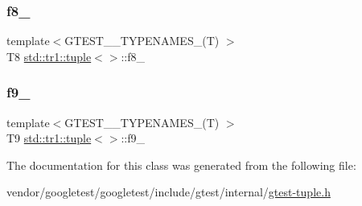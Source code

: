 \mbox{\label{classstd_1_1tr1_1_1tuple_ae859012c83943e54e035a4a32089ccb6}} 
\subsubsection{\texorpdfstring{f8\+\_\+}{f8\_}}
{\footnotesize\ttfamily template$<$G\+T\+E\+S\+T\+\_\+\_\+\+T\+Y\+P\+E\+N\+A\+M\+E\+S\+\_\+(\+T) $>$ \\
T8 \hyperlink{classstd_1_1tr1_1_1tuple}{std\+::tr1\+::tuple}$<$$>$\+::f8\+\_\+}

\mbox{\label{classstd_1_1tr1_1_1tuple_a336d5e582fd34e45ec88c78d473671dd}} 
\subsubsection{\texorpdfstring{f9\+\_\+}{f9\_}}
{\footnotesize\ttfamily template$<$G\+T\+E\+S\+T\+\_\+\_\+\+T\+Y\+P\+E\+N\+A\+M\+E\+S\+\_\+(\+T) $>$ \\
T9 \hyperlink{classstd_1_1tr1_1_1tuple}{std\+::tr1\+::tuple}$<$$>$\+::f9\+\_\+}



The documentation for this class was generated from the following file\+:\begin{DoxyCompactItemize}
\item 
vendor/googletest/googletest/include/gtest/internal/\hyperlink{gtest-tuple_8h}{gtest-\/tuple.\+h}\end{DoxyCompactItemize}
